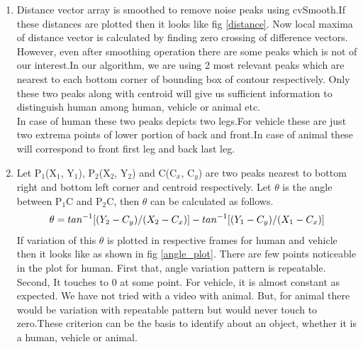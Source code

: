 \begin{enumerate}
\item Distance vector array is smoothed to remove noise peaks using
cvSmooth.If these distances are plotted then it looks like fig
\ref{distance}. Now local maxima of distance vector is
calculated by finding zero crossing of difference vectors.\\ However,
even after smoothing operation there are some peaks which is not of our
interest.In our algorithm, we are using 2 most relevant peaks which are
nearest to each bottom corner of bounding box of contour respectively.
Only these two peaks along with centroid will give us sufficient information
to distinguish human among human, vehicle or animal etc.\\
In case of human these two peaks depicts two legs.For vehicle these are
just two extrema points of lower portion of back and front.In case of
animal these will correspond to front first leg and back last leg.
\item Let P$_1$(X$_1$, Y$_1$), P$_2$(X$_2$, Y$_2$) and C(C$_x$, C$_y$) are two peaks
nearest to bottom right and bottom left corner and centroid
respectively. Let $\theta$ is the angle between P$_1$C and P$_2$C, then
$\theta$ can be calculated as follows.\\
%
	\begin{equation}
	\theta = tan^{-1}[(Y_2 - C_y) / (X_2 - C_x)] \\ - tan^{-1}[(Y_1 - C_y) / (X_1 - C_x)]
	\end{equation}
%
If variation of this $\theta$ is plotted in respective frames for human
and vehicle then it looks like as shown in fig \ref{angle_plot}. There
are few points noticeable in the plot for human. First that, angle
variation pattern is repeatable. Second, It touches to 0 at some point.
For vehicle, it is almost constant as expected. We have not tried with a
video with animal. But, for animal there would be variation with
repeatable pattern but would never touch to zero.These criterion can be
the basis to identify about an object, whether it is a human, vehicle or
animal.


\end{enumerate}
